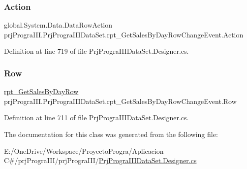 \subsubsection{\texorpdfstring{Action}{Action}}
{\footnotesize\ttfamily global.\+System.\+Data.\+Data\+Row\+Action prj\+Progra\+I\+I\+I.\+Prj\+Progra\+I\+I\+I\+Data\+Set.\+rpt\+\_\+\+Get\+Sales\+By\+Day\+Row\+Change\+Event.\+Action\hspace{0.3cm}{\ttfamily [get]}}



Definition at line 719 of file Prj\+Progra\+I\+I\+I\+Data\+Set.\+Designer.\+cs.

\hypertarget{classprj_progra_i_i_i_1_1_prj_progra_i_i_i_data_set_1_1rpt___get_sales_by_day_row_change_event_a55e3f6ed335bcb0f384ef7686770cf3b}{}\label{classprj_progra_i_i_i_1_1_prj_progra_i_i_i_data_set_1_1rpt___get_sales_by_day_row_change_event_a55e3f6ed335bcb0f384ef7686770cf3b} 
\subsubsection{\texorpdfstring{Row}{Row}}
{\footnotesize\ttfamily \hyperlink{classprj_progra_i_i_i_1_1_prj_progra_i_i_i_data_set_1_1rpt___get_sales_by_day_row}{rpt\+\_\+\+Get\+Sales\+By\+Day\+Row} prj\+Progra\+I\+I\+I.\+Prj\+Progra\+I\+I\+I\+Data\+Set.\+rpt\+\_\+\+Get\+Sales\+By\+Day\+Row\+Change\+Event.\+Row\hspace{0.3cm}{\ttfamily [get]}}



Definition at line 711 of file Prj\+Progra\+I\+I\+I\+Data\+Set.\+Designer.\+cs.



The documentation for this class was generated from the following file\+:\begin{DoxyCompactItemize}
\item 
E\+:/\+One\+Drive/\+Workspace/\+Proyecto\+Progra/\+Aplicacion C\#/prj\+Progra\+I\+I\+I/prj\+Progra\+I\+I\+I/\hyperlink{_prj_progra_i_i_i_data_set_8_designer_8cs}{Prj\+Progra\+I\+I\+I\+Data\+Set.\+Designer.\+cs}\end{DoxyCompactItemize}
